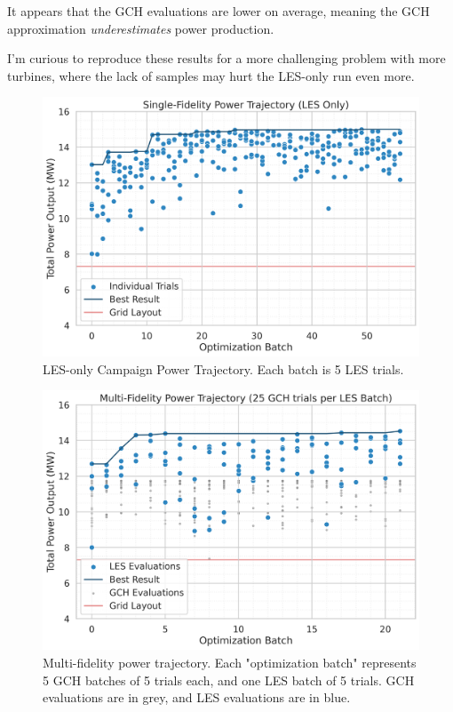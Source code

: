 \documentclass[11pt]{article}
\begin{document}
It appears that the GCH evaluations are lower on average, meaning the GCH approximation
\emph{underestimates} power production.

I'm curious to reproduce these results for a more challenging problem with more turbines,
where the lack of samples may hurt the LES-only run even more.

\begin{figure}[htbp]
    \centering
    \includegraphics[scale=0.65]{../campaigns/les_only/power_trajectory.png}
    \caption{LES-only Campaign Power Trajectory. Each batch is 5 LES trials.
    }
    \label{fig:les_only_trajectory}
\end{figure}
\begin{figure}[htbp]
    \centering
    \includegraphics[scale=0.65]{../campaigns/mf_alternating/power_trajectory.png}
    \caption{Multi-fidelity power trajectory. Each "optimization batch" represents
        5 GCH batches of 5 trials each, and one LES batch of 5 trials. GCH evaluations are
        in grey, and LES evaluations are in blue.
    }
    \label{fig:mf_alternating_trajectory}
\end{figure}
\end{document}
